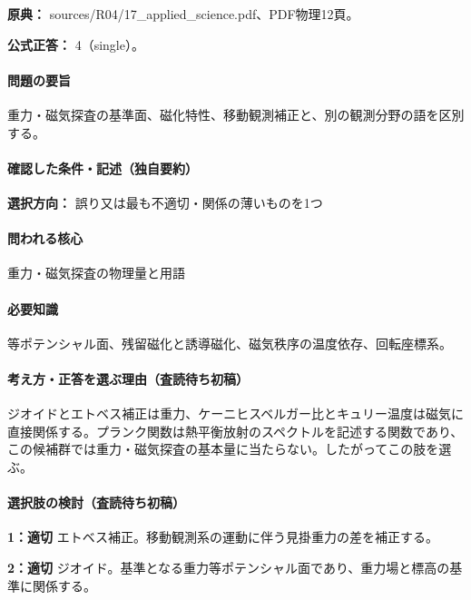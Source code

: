 \noindent\textbf{原典：} sources/R04/17\_applied\_science.pdf、PDF物理12頁。

\textbf{公式正答：} 4（single）。

\paragraph{問題の要旨} 重力・磁気探査の基準面、磁化特性、移動観測補正と、別の観測分野の語を区別する。

\paragraph{確認した条件・記述（独自要約）}\mbox{}\par

\noindent\textbf{選択方向：} 誤り又は最も不適切・関係の薄いものを1つ\par

\paragraph{問われる核心} 重力・磁気探査の物理量と用語

\paragraph{必要知識} 等ポテンシャル面、残留磁化と誘導磁化、磁気秩序の温度依存、回転座標系。

\paragraph{考え方・正答を選ぶ理由（査読待ち初稿）} ジオイドとエトベス補正は重力、ケーニヒスベルガー比とキュリー温度は磁気に直接関係する。プランク関数は熱平衡放射のスペクトルを記述する関数であり、この候補群では重力・磁気探査の基本量に当たらない。したがってこの肢を選ぶ。

\paragraph{選択肢の検討（査読待ち初稿）}\mbox{}\par

\noindent\textbf{1：適切} エトベス補正。移動観測系の運動に伴う見掛重力の差を補正する。\par

\noindent\textbf{2：適切} ジオイド。基準となる重力等ポテンシャル面であり、重力場と標高の基準に関係する。\par

